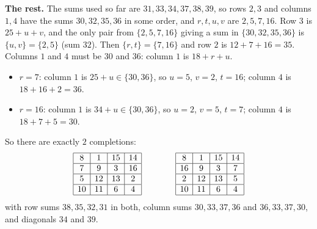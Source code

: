 \textbf{The rest.} The sums used so far are $31,33,34,37,38,39$, so rows $2,3$ and columns $1,4$ have the sums $30,32,35,36$ in some order, and $r,t,u,v$ are $2,5,7,16$. Row $3$ is $25+u+v$, and the only pair from $\{2,5,7,16\}$ giving a sum in $\{30,32,35,36\}$ is $\{u,v\}=\{2,5\}$ (sum $32$). Then $\{r,t\}=\{7,16\}$ and row $2$ is $12+7+16=35$. Columns $1$ and $4$ must be $30$ and $36$: column $1$ is $18+r+u$.
\begin{itemize}
\item $r=7$: column $1$ is $25+u\in\{30,36\}$, so $u=5$, $v=2$, $t=16$; column $4$ is $18+16+2=36$. \checkmark
\item $r=16$: column $1$ is $34+u\in\{30,36\}$, so $u=2$, $v=5$, $t=7$; column $4$ is $18+7+5=30$. \checkmark
\end{itemize}
So there are exactly $\boxed{2}$ completions:
\[
\begin{array}{|c|c|c|c|}
\hline 8 & 1 & 15 & 14\\
\hline 7 & 9 & 3 & 16\\
\hline 5 & 12 & 13 & 2\\
\hline 10 & 11 & 6 & 4\\
\hline
\end{array}
\qquad\qquad
\begin{array}{|c|c|c|c|}
\hline 8 & 1 & 15 & 14\\
\hline 16 & 9 & 3 & 7\\
\hline 2 & 12 & 13 & 5\\
\hline 10 & 11 & 6 & 4\\
\hline
\end{array}
\]
with row sums $38,35,32,31$ in both, column sums $30,33,37,36$ and $36,33,37,30$, and diagonals $34$ and $39$.
